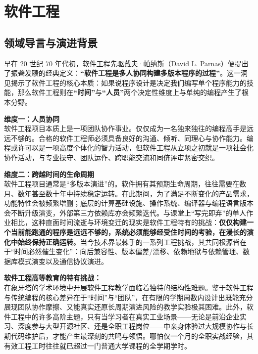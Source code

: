\chapter{软件工程}

\section{领域导言与演进背景}

\begin{preamblebox}[知识领域概述与时代演进]
早在 20 世纪 70 年代初，软件工程先驱戴夫·帕纳斯（David L. Parnas）便提出了振聋发聩的经典定义：\textbf{“软件工程是多人协同构建多版本程序的过程”}。这一洞见揭示了软件工程的核心本质：如果说程序设计是决定我们编写单个程序能力的技能，那么软件工程则在\textbf{“时间”}与\textbf{“人员”}两个决定性维度上与单纯的编程产生了根本分野。

\textbf{维度一：人员协同}\\
软件工程项目本质上是一项团队协作事业。仅仅成为一名独来独往的编程高手是远远不够的。合格的软件工程师必须具备良好的沟通、倾听、同理心与协作能力。编程或许可以是一项高度个体化的智力活动，但软件工程从立项之初就是一项社会化协作活动，与专业操守、团队运作、跨职能交流和同侪评审紧密交织。

\textbf{维度二：跨越时间的生命周期}\\
软件工程项目通常是“多版本演进”的。软件拥有其预期生命周期，往往需要在数月、数年甚至数十年中持续稳定运转。在此期间，为了满足不断变化的产品需求，功能特性会被频繁增删；底层的计算基础设施、操作系统、编译器与编程语言版本会不断升级演变，外部第三方依赖库亦会频繁迭代。与课堂上“写完即弃”的单人作业相比，这种直面时间流逝与环境变迁的现实是软件工程特有的挑战：\textbf{仅仅构建一个当前能跑通的程序是远远不够的，系统必须能够经受住时间的考验，在漫长的演化中始终保持正确运转}。当今技术界最棘手的一系列工程挑战，其共同根源皆在于“时间必然催生变化”：向后兼容性、版本偏差/漂移、依赖地狱与依赖管理、数据库模式演变以及通信协议演进。

\textbf{软件工程高等教育的特有挑战：}\\
在象牙塔的学术环境中开展软件工程教学面临着独特的结构性难题。鉴于软件工程与传统编程的核心差异在于“时间”与“团队”，在有限的学期周数内设计出既能充分展现团队协作摩擦、又能真实还原长周期演进风险的教学实验极其困难。此外，软件工程中的许多高阶主题，只有当学习者在真实工业场景——无论是前沿企业实习、深度参与大型开源社区、还是全职工程岗位——中亲身体验过大规模协作与长期代码维护后，才能产生最深刻的共鸣与领悟。哪怕仅一个月的全职实战经验，其有效工程工时往往就已超过一门普通大学课程的全学期学时。


\end{preamblebox}
